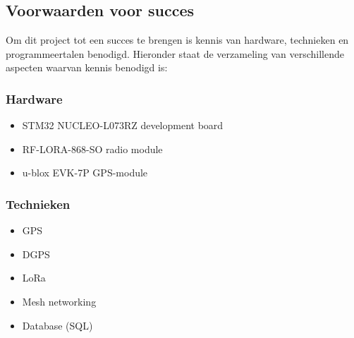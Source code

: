 \newpage
\subsection{Voorwaarden voor succes}
Om dit project tot een succes te brengen is kennis van hardware, technieken
en programmeertalen benodigd. Hieronder staat de verzameling van verschillende
aspecten waarvan kennis benodigd is:
\subsubsection{Hardware}
\begin{itemize}
    \item STM32 NUCLEO-L073RZ development board
    \item RF-LORA-868-SO radio module
    \item u-blox EVK-7P GPS-module
\end{itemize}
\subsubsection{Technieken}
\begin{itemize}
    \item GPS
    \item DGPS
    \item LoRa
    \item Mesh networking
    \item Database (SQL)
\end{itemize}
